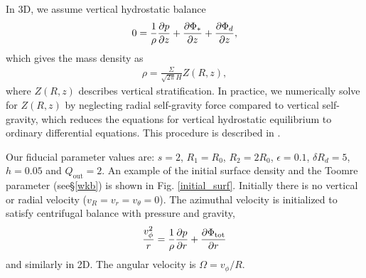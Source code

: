 In 3D, we assume vertical hydrostatic balance
\begin{align}
  0 = \frac{1}{\rho}\frac{\partial p}{\partial z} + \frac{\partial\Phi_*}{\partial z} + \frac{\partial
    \Phi_d}{\partial z},  
\end{align}
which gives the mass density as 
\begin{align}
  \rho = \frac{\Sigma}{\sqrt{2\pi}H}Z(R,z),
\end{align}
where $Z(R,z)$ describes vertical stratification. In practice, we
numerically solve for $Z(R,z)$ by neglecting radial self-gravity
force compared to vertical self-gravity, which reduces the equations
for vertical hydrostatic equilibrium to ordinary differential
equations.  This procedure is described in \cite{lin12b}. 

Our fiducial parameter values are: $s=2$, $R_{1}=R_0$, $R_{2}=2R_0$,
$\epsilon=0.1$, $\delta R_d=5$, $h=0.05$ and
$Q_\mathrm{out}=2$. An example of the initial surface density and the
Toomre parameter (see\S\ref{wkb}) is shown in Fig. \ref{initial_surf}. 
Initially there is no vertical or radial velocity
($v_R = v_r = v_\theta = 0$). The azimuthal velocity is initialized to
satisfy centrifugal balance with pressure and gravity,
\begin{align}
  \frac{v_\phi^2}{r} = \frac{1}{\rho}\frac{\partial p}{\partial r} + \frac{\partial
    \Phi_\mathrm{tot}}{\partial r}
\end{align}
and similarly in 2D. The angular velocity is $\Omega = v_\phi/R$. 



